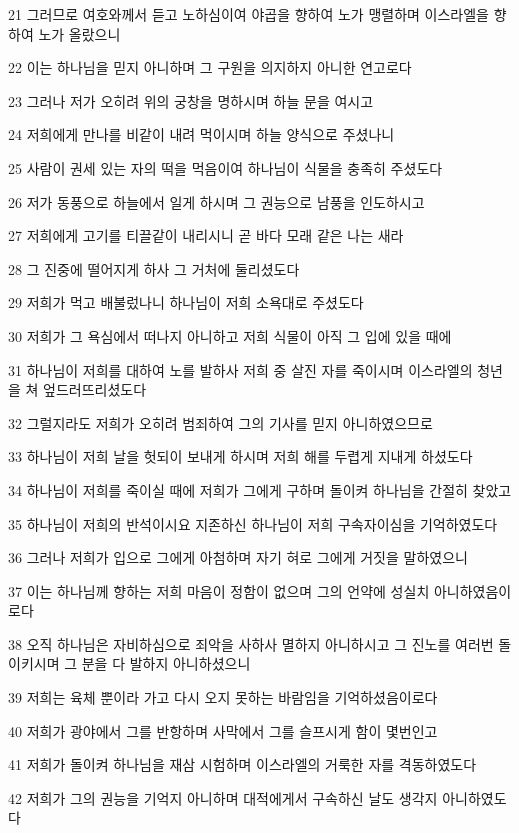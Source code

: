 \par 21 그러므로 여호와께서 듣고 노하심이여 야곱을 향하여 노가 맹렬하며 이스라엘을 향하여 노가 올랐으니
\par 22 이는 하나님을 믿지 아니하며 그 구원을 의지하지 아니한 연고로다
\par 23 그러나 저가 오히려 위의 궁창을 명하시며 하늘 문을 여시고
\par 24 저희에게 만나를 비같이 내려 먹이시며 하늘 양식으로 주셨나니
\par 25 사람이 권세 있는 자의 떡을 먹음이여 하나님이 식물을 충족히 주셨도다
\par 26 저가 동풍으로 하늘에서 일게 하시며 그 권능으로 남풍을 인도하시고
\par 27 저희에게 고기를 티끌같이 내리시니 곧 바다 모래 같은 나는 새라
\par 28 그 진중에 떨어지게 하사 그 거처에 둘리셨도다
\par 29 저희가 먹고 배불렀나니 하나님이 저희 소욕대로 주셨도다
\par 30 저희가 그 욕심에서 떠나지 아니하고 저희 식물이 아직 그 입에 있을 때에
\par 31 하나님이 저희를 대하여 노를 발하사 저희 중 살진 자를 죽이시며 이스라엘의 청년을 쳐 엎드러뜨리셨도다
\par 32 그럴지라도 저희가 오히려 범죄하여 그의 기사를 믿지 아니하였으므로
\par 33 하나님이 저희 날을 헛되이 보내게 하시며 저희 해를 두렵게 지내게 하셨도다
\par 34 하나님이 저희를 죽이실 때에 저희가 그에게 구하며 돌이켜 하나님을 간절히 찾았고
\par 35 하나님이 저희의 반석이시요 지존하신 하나님이 저희 구속자이심을 기억하였도다
\par 36 그러나 저희가 입으로 그에게 아첨하며 자기 혀로 그에게 거짓을 말하였으니
\par 37 이는 하나님께 향하는 저희 마음이 정함이 없으며 그의 언약에 성실치 아니하였음이로다
\par 38 오직 하나님은 자비하심으로 죄악을 사하사 멸하지 아니하시고 그 진노를 여러번 돌이키시며 그 분을 다 발하지 아니하셨으니
\par 39 저희는 육체 뿐이라 가고 다시 오지 못하는 바람임을 기억하셨음이로다
\par 40 저희가 광야에서 그를 반항하며 사막에서 그를 슬프시게 함이 몇번인고
\par 41 저희가 돌이켜 하나님을 재삼 시험하며 이스라엘의 거룩한 자를 격동하였도다
\par 42 저희가 그의 권능을 기억지 아니하며 대적에게서 구속하신 날도 생각지 아니하였도다

